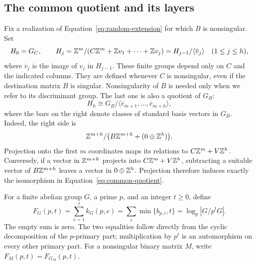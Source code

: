 \subsection{The common quotient and its layers}

Fix a realization of Equation~\eqref{eq:random-extension} for which
\(B\) is nonsingular. Set
\begin{equation}\label{eq:successive-quotients}
 H_0=G_C,\qquad
 H_j=\mathbb Z^m/(C\mathbb Z^m+\mathbb Z v_1+\cdots+\mathbb Z v_j)
     =H_{j-1}/\langle\overline v_j\rangle
       \quad(1\le j\le h),
\end{equation}
where \(\overline v_j\) is the image of \(v_j\) in \(H_{j-1}\).
These finite groups depend only on \(C\) and the indicated columns.
They are defined whenever \(C\) is nonsingular, even if the destination
matrix \(B\) is singular. Nonsingularity of \(B\) is needed only when
we refer to its discriminant group.
The last one is also a quotient of \(G_B\):
\begin{equation}\label{eq:common-quotient}
 H_h\cong G_B/\langle\overline e_{m+1},\ldots,
                         \overline e_{m+h}\rangle,
\end{equation}
where the bars on the right denote classes of standard basis vectors in
\(G_B\). Indeed, the right side is
\[
 \mathbb Z^{m+h}/\bigl(B\mathbb Z^{m+h}+(0\oplus\mathbb Z^h)\bigr).
\]
Projection onto the first \(m\) coordinates maps its relations to
\(C\mathbb Z^m+V\mathbb Z^h\). Conversely, if a vector in \(\mathbb Z^{m+h}\) projects
into \(C\mathbb Z^m+V\mathbb Z^h\), subtracting a suitable vector of
\(B\mathbb Z^{m+h}\) leaves a vector in \(0\oplus\mathbb Z^h\). Projection
therefore induces exactly the isomorphism in
Equation~\eqref{eq:common-quotient}.

For a finite abelian group \(G\), a prime \(p\), and an integer
\(t\ge0\), define
\begin{equation}\label{eq:layer-prefix}
 F_G(p,t)=\sum_{e=1}^{t}k_G(p,e)
         =\sum_i\min\{b_{p,i},t\}
         =\log_p|G/p^tG|.
\end{equation}
The empty sum is zero. The two equalities follow directly from the
cyclic decomposition of the \(p\)-primary part; multiplication by
\(p^t\) is an automorphism on every other primary part. For a
nonsingular binary matrix \(M\), write \(F_M(p,t)=F_{G_M}(p,t)\).

